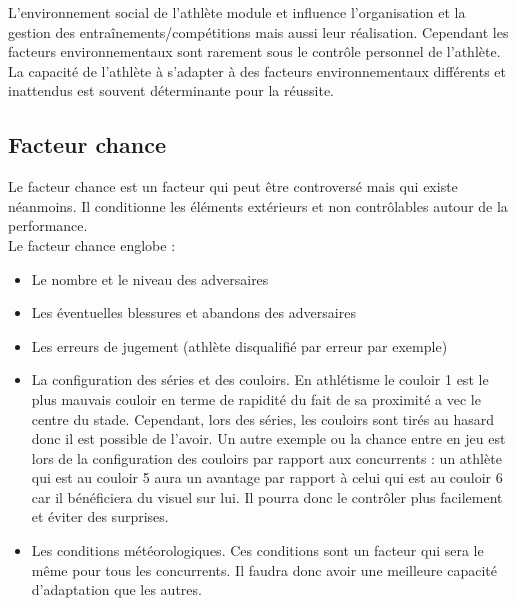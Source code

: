          
            L'environnement social de l'athlète module et influence l'organisation et la gestion des entraînements/compétitions mais aussi leur réalisation.
            Cependant les facteurs environnementaux sont rarement sous le contrôle personnel de l'athlète. La capacité de l'athlète à s'adapter à des facteurs environnementaux différents et inattendus est souvent déterminante pour la réussite. \\
            
                
        \vspace{10pt}
            
            
        \subsection{Facteur chance}    
            
            Le facteur chance est un facteur qui peut être controversé mais qui existe néanmoins. Il conditionne les éléments extérieurs et non contrôlables autour de la performance.\\
            
            Le facteur chance englobe :
            \begin{itemize}
                \item Le nombre et le niveau des adversaires
                \item Les éventuelles blessures et abandons des adversaires
                \item Les erreurs de jugement (athlète disqualifié par erreur par exemple)
                \item La configuration des séries et des couloirs. En athlétisme le couloir 1 est le plus mauvais couloir en terme de rapidité du fait de sa proximité a
                vec le centre du stade. Cependant, lors des séries, les couloirs sont tirés au  hasard donc il est possible de l'avoir. Un autre exemple ou la chance entre en jeu est lors de la configuration des couloirs par rapport aux concurrents : un athlète qui est au couloir 5 aura un avantage par rapport à celui qui est au couloir 6 car il bénéficiera du visuel sur lui. Il pourra donc le contrôler plus facilement et éviter des surprises.
                \item Les conditions météorologiques. Ces conditions sont un facteur qui sera le même pour tous les concurrents. Il faudra donc avoir une meilleure capacité d'adaptation que les autres.
            \end{itemize}
            
